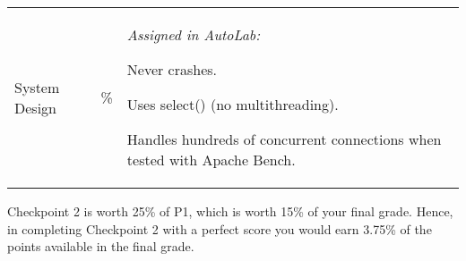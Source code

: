 \begin{center}
\begin{tabular}{>{\centering\arraybackslash}m{1in}>{\centering\arraybackslash}m{1in}p{3in}}
  \hline
  \addlinespace[5pt]

  System Design&30\%&\vspace{-10pt} 
                              {\it Assigned in AutoLab:}
                              \begin{packed_itemize}
                                \item Never crashes.
                                \item Uses select() (no multithreading).
                                \item Handles hundreds of concurrent connections when tested with Apache Bench.
                              \end{packed_itemize}\\

\end{tabular}
\end{center}


\noindent Checkpoint 2 is worth 25\% of P1, which is worth 15\% of your final grade. Hence, in completing Checkpoint 2 with a perfect score you would earn 3.75\% of the points available in the final grade.


